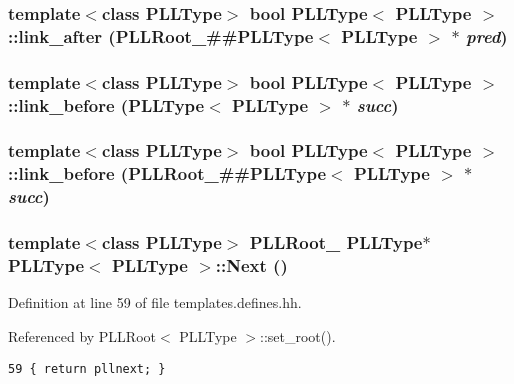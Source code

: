 \subsubsection{\setlength{\rightskip}{0pt plus 5cm}template$<$class PLLType$>$ bool PLLType$<$ PLLType $>$::link\_\-after (PLLRoot\_\-\#\#PLLType$<$ PLLType $>$ $\ast$ {\em pred})\hspace{0.3cm}{\tt  [inline]}}\label{classPLLType_a21}


\subsubsection{\setlength{\rightskip}{0pt plus 5cm}template$<$class PLLType$>$ bool PLLType$<$ PLLType $>$::link\_\-before (PLLType$<$ PLLType $>$ $\ast$ {\em succ})\hspace{0.3cm}{\tt  [inline]}}\label{classPLLType_a20}


\subsubsection{\setlength{\rightskip}{0pt plus 5cm}template$<$class PLLType$>$ bool PLLType$<$ PLLType $>$::link\_\-before (PLLRoot\_\-\#\#PLLType$<$ PLLType $>$ $\ast$ {\em succ})\hspace{0.3cm}{\tt  [inline]}}\label{classPLLType_a19}


\subsubsection{\setlength{\rightskip}{0pt plus 5cm}template$<$class PLLType$>$ PLLRoot\_\- PLLType$\ast$ PLLType$<$ PLLType $>$::Next ()\hspace{0.3cm}{\tt  [inline]}}\label{classPLLType_a1}




Definition at line 59 of file templates.defines.hh.

Referenced by PLLRoot$<$ PLLType $>$::set\_\-root().



\footnotesize\begin{verbatim}59 { return pllnext; } 
\end{verbatim}\normalsize 
{}
